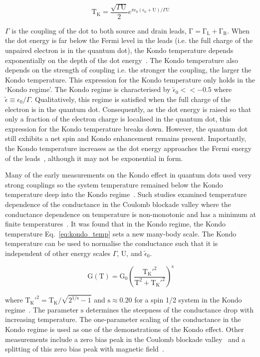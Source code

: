 \begin{equation}\label{eq:kondo_temp}
 \mathrm{T_K} = 
 \frac{\sqrt{\Gamma \mathrm{U}}}{2}
 e^{\pi \epsilon_0 (\epsilon_0 + \mathrm{U})/\Gamma\mathrm{U}}
\end{equation}

 \noindent $\Gamma$ is the coupling of the dot to both source and drain leads, $\mathrm{\Gamma = \Gamma_L + \Gamma_R}$. When the dot energy is far below the Fermi level in the leads (i.e. the full charge of the unpaired electron is in the quantum dot), the Kondo temperature depends exponentially on the depth of the dot energy~\cite{goldhaber_mv}. The Kondo temperature also depends on the strength of coupling i.e. the stronger the coupling, the larger the Kondo temperature. This expression for the Kondo temperature only holds in the `Kondo regime'. The Kondo regime is characterised by $\tilde{\epsilon}_0<<-0.5$ where $\tilde{\epsilon}\equiv \epsilon_0/\Gamma$. Qualitatively, this regime is satisfied when the full charge of the electron is in the quantum dot. Consequently, as the dot energy is raised so that only a fraction of the electron charge is localised in the quantum dot, this expression for the Kondo temperature breaks down. However, the quantum dot still exhibits a net spin and Kondo enhancement remains present. Importantly, the Kondo temperature increases as the dot energy approaches the Fermi energy of the leads~\cite{goldhaber_mv}, although it may not be exponential in form. 

Many of the early measurements on the Kondo effect in quantum dots used very strong couplings so the system temperature remained below the Kondo temperature deep into the Kondo regime~\cite{kondo_unitary}. Such studies examined temperature dependence of the conductance in the Coulomb blockade valley where the conductance dependence on temperature is non-monotonic and has a minimum at finite temperatures~\cite{Pustilnik2004}. It was found that in the Kondo regime, the Kondo temperature Eq.~\ref{eq:kondo_temp} sets a new many-body scale. The Kondo temperature can be used to normalise the conductance such that it is independent of other energy scales $\Gamma$, $\mathrm{U}$, and $\tilde{\epsilon}_0$.

\begin{equation}\label{eq:kondo_conductance}
 \mathrm{G(T)} =
 \mathrm{G_0}
 \left(
 \frac{\mathrm{T_K'^{2}}}{\mathrm{T^2} + \mathrm{T_K'^{2}}}
 \right)^\mathrm{s}
\end{equation}

where $\mathrm{T_K'^{2}} = \mathrm{T_K}/\sqrt{2^{\mathrm{1/s}}-1}$ and $\mathrm{s} \approx 0.20$ for a spin 1/2 system in the Kondo regime~\cite{goldhaber_mv}. The parameter $\mathrm{s}$ determines the steepness of the conductance drop with increasing temperature. The one-parameter scaling of the conductance in the Kondo regime is used as one of the demonstrations of the Kondo effect. Other measurements include a zero bias peak in the Coulomb blockade valley~\cite{kondo_unitary} and a splitting of this zero bias peak with magnetic field~\cite{cronenwett_tunable_kondo}. 

